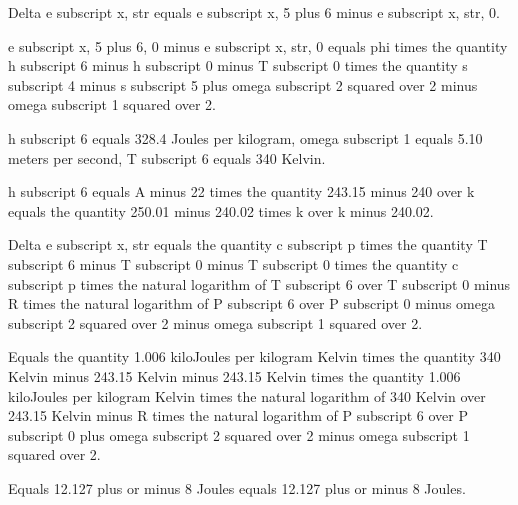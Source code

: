 Delta e subscript x, str equals e subscript x, 5 plus 6 minus e subscript x, str, 0.

e subscript x, 5 plus 6, 0 minus e subscript x, str, 0 equals phi times the quantity h subscript 6 minus h subscript 0 minus T subscript 0 times the quantity s subscript 4 minus s subscript 5 plus omega subscript 2 squared over 2 minus omega subscript 1 squared over 2.

h subscript 6 equals 328.4 Joules per kilogram, omega subscript 1 equals 5.10 meters per second, T subscript 6 equals 340 Kelvin.

h subscript 6 equals A minus 22 times the quantity 243.15 minus 240 over k equals the quantity 250.01 minus 240.02 times k over k minus 240.02.

Delta e subscript x, str equals the quantity c subscript p times the quantity T subscript 6 minus T subscript 0 minus T subscript 0 times the quantity c subscript p times the natural logarithm of T subscript 6 over T subscript 0 minus R times the natural logarithm of P subscript 6 over P subscript 0 minus omega subscript 2 squared over 2 minus omega subscript 1 squared over 2.

Equals the quantity 1.006 kiloJoules per kilogram Kelvin times the quantity 340 Kelvin minus 243.15 Kelvin minus 243.15 Kelvin times the quantity 1.006 kiloJoules per kilogram Kelvin times the natural logarithm of 340 Kelvin over 243.15 Kelvin minus R times the natural logarithm of P subscript 6 over P subscript 0 plus omega subscript 2 squared over 2 minus omega subscript 1 squared over 2.

Equals 12.127 plus or minus 8 Joules equals 12.127 plus or minus 8 Joules.